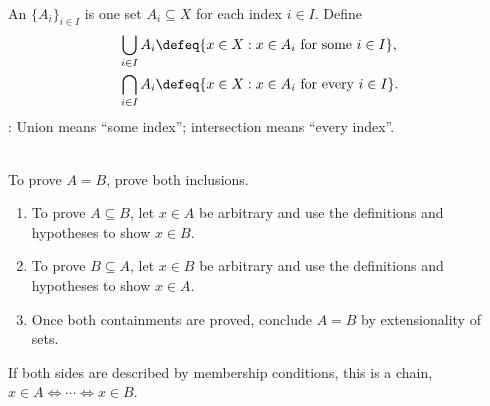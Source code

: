 \begin{definition} \label{def:indexed-families-unions-intersections} \\
An  $\{A_i\}_{i\in I}$ is one set $A_i\subseteq X$ for each index $i\in I$. Define
\begin{align}
\bigcup_{i\in I}A_i&\defeq\{x\in X:x\in A_i\text{ for some }i\in I\}, \nonumber\\
\bigcap_{i\in I}A_i&\defeq\{x\in X:x\in A_i\text{ for every }i\in I\}. \nonumber
\end{align}
: Union means ``some index''; intersection means ``every index''.
\end{definition}

\begin{method} \label{meth:proof-by-containment} \\
To prove $A=B$, prove both inclusions.
\begin{enumerate}[label=(\roman*)]
\setlength{\itemsep}{0pt}
\item To prove $A\subseteq B$, let $x\in A$ be arbitrary and use the definitions and hypotheses to show $x\in B$.
\item To prove $B\subseteq A$, let $x\in B$ be arbitrary and use the definitions and hypotheses to show $x\in A$.
\item Once both containments are proved, conclude $A=B$ by extensionality of sets.
\end{enumerate}
If both sides are described by membership conditions, this is a chain, $x\in A \Longleftrightarrow \cdots \Longleftrightarrow x\in B$.
\end{method}

